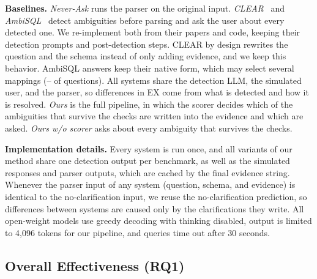 \textbf{Baselines.} \emph{Never-Ask} runs the parser on the original
input. \emph{CLEAR}~\cite{zhang2025clear} and
\emph{AmbiSQL}~\cite{ding2025ambisql} detect ambiguities before
parsing and ask the user about every detected one. We re-implement
both from their papers and code, keeping their detection prompts and
post-detection steps. CLEAR by design rewrites the question and the
schema instead of only adding evidence, and we keep this behavior.
AmbiSQL answers keep their native form, which may select several
mappings (\ambiMultiPctMin--\ambiMultiPctMax{} of questions). All
systems share the detection LLM, the simulated user, and the parser,
so differences in EX come from what is detected and how it is
resolved. \emph{Ours} is the full pipeline, in which the scorer
decides which of the ambiguities that survive the checks are written
into the evidence and which are asked. \emph{Ours w/o scorer} asks
about every ambiguity that survives the checks.

\textbf{Implementation details.} Every system is run once, and all
variants of our method share one detection output per benchmark, as
well as the simulated responses and parser outputs, which are cached
by the final evidence string. Whenever the parser input of any system
(question, schema, and evidence) is identical to the
no-clarification input, we reuse the no-clarification prediction, so
differences between systems are caused only by the clarifications they
write. All open-weight models use greedy decoding with thinking
disabled, output is limited to 4{,}096 tokens for our pipeline, and
queries time out after 30 seconds.

\subsection{Overall Effectiveness (RQ1)}
\label{sec:exp-rq1}

